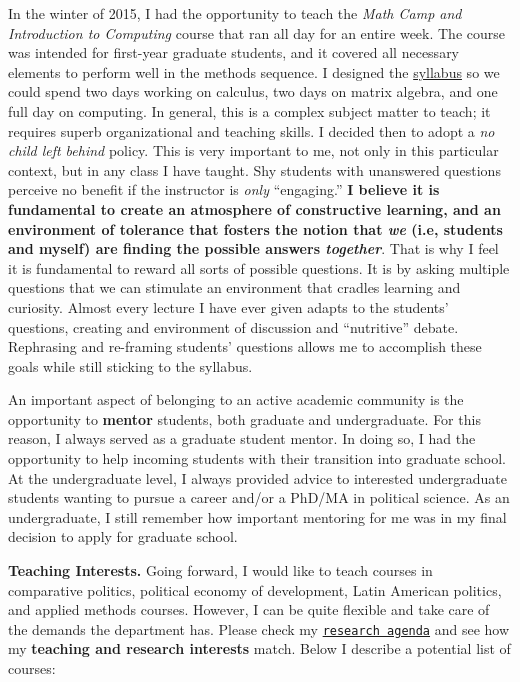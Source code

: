 In the winter of 2015, I had the opportunity to teach the \emph{Math Camp and Introduction to Computing} course that ran all day for an entire week. The course was intended for first-year graduate students, and it covered all necessary elements to perform well in the methods sequence. I designed the \href{https://github.com/hbahamonde/Math-Camp/raw/master/Syllabus/Math_Camp_Syllabus.pdf}{syllabus} so we could spend two days working on calculus, two days on matrix algebra, and one full day on computing. In general, this is a complex subject matter to teach; it requires superb organizational and teaching skills. I decided then to adopt a \emph{no child left behind} policy. This is very important to me, not only in this particular context, but in any class I have taught. Shy students with unanswered questions perceive no benefit if the instructor is \emph{only} ``engaging.'' {\bf I believe it is fundamental to create an atmosphere of constructive learning, and an environment of tolerance that fosters the notion that \emph{we} (i.e, students and myself) are finding the possible answers \emph{together}}. That is why I feel it is fundamental to reward all sorts of possible questions. It is by asking multiple questions that we can stimulate an environment that cradles learning and curiosity. Almost every lecture I have ever given adapts to the students' questions, creating and environment of discussion and ``nutritive'' debate. Rephrasing and re-framing students' questions allows me to accomplish these goals while still sticking to the syllabus. 

An important aspect of belonging to an active academic community is the opportunity to {\bf mentor} students, both graduate and undergraduate. For this reason, I always served as a graduate student mentor. In doing so, I had the opportunity to help incoming students with their transition into graduate school. At the undergraduate level, I always provided advice to interested undergraduate students wanting to pursue a career and/or a PhD/MA in political science. As an undergraduate, I still remember how important mentoring for me was in my final decision to apply for graduate school.

{\bf Teaching Interests.} Going forward, I would like to teach courses in comparative politics, political economy of development, Latin American politics, and applied methods courses. However, I can be quite flexible and take care of the demands the department has. Please check my \href{http://www.hectorbahamonde.com/research/}{\texttt{research agenda}} and see how my {\bf teaching and research interests} match. Below I describe a potential list of courses:
